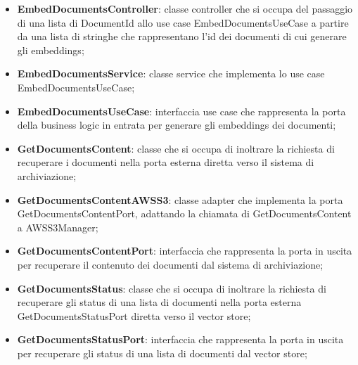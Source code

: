 \documentclass[10pt, a4paper]{article}
\begin{document}
\begin{itemize}
    \item \label{EmbedDocumentsController}\textbf{EmbedDocumentsController}: classe controller che si occupa del passaggio di una lista di DocumentId allo use case EmbedDocumentsUseCase a partire da una lista di stringhe che rappresentano l'id dei documenti di cui generare gli embeddings;
    \item \label{EmbedDocumentsService}\textbf{EmbedDocumentsService}: classe service che implementa lo use case EmbedDocumentsUseCase;
    \item \label{EmbedDocumentsUseCase}\textbf{EmbedDocumentsUseCase}: interfaccia use case che rappresenta la porta della business logic in entrata per generare gli embeddings dei documenti;    
    \item \label{GetDocumentsContent}\textbf{GetDocumentsContent}: classe che si occupa di inoltrare la richiesta di recuperare i documenti nella porta esterna diretta verso il sistema di archiviazione;
    
    \item \label{GetDocumentsContentAWSS3}\textbf{GetDocumentsContentAWSS3}: classe adapter che implementa la porta GetDocumentsContentPort, adattando la chiamata di GetDocumentsContent a AWSS3Manager;
    \item \label{GetDocumentsContentPort}\textbf{GetDocumentsContentPort}: interfaccia che rappresenta la porta in uscita per recuperare il contenuto dei documenti dal sistema di archiviazione;
    \item \label{GetDocumentsStatus}\textbf{GetDocumentsStatus}: classe che si occupa di inoltrare la richiesta di recuperare gli status di una lista di documenti nella porta esterna GetDocumentsStatusPort diretta verso il vector store;
    \item  \label{GetDocumentsStatusPort}\textbf{GetDocumentsStatusPort}: interfaccia che rappresenta la porta in uscita per recuperare gli status di una lista di documenti dal vector store;
    

\end{itemize}
\end{document}
